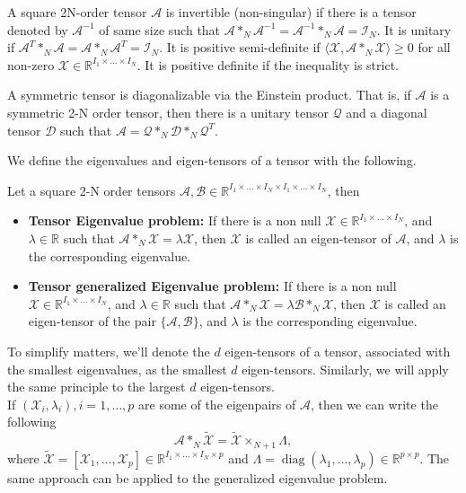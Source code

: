 \documentclass{siamltex}
\begin{document}
\medskip
\begin{definition}
A square 2N-order tensor $\mathcal{A}$ is invertible (non-singular) if there is a tensor denoted by $\mathcal{A}^{-1}$ of same size such that $\mathcal{A} *_N \mathcal{A}^{-1}=\mathcal{A}^{-1} *_N \mathcal{A} =\mathcal{I}_N$. It is unitary if $\mathcal{A}^T *_N \mathcal{A}=\mathcal{A} *_N \mathcal{A}^T =\mathcal{I}_N$.
It is positive semi-definite if $\langle \mathcal{X},\mathcal{A} *_N \mathcal{X}\rangle \geq 0$ for all non-zero $\mathcal{X} \in \mathbb{R}^{I_1 \times \ldots \times I_N}$.
It is positive definite if the inequality is strict.
\end{definition}

\medskip
\begin{theorem}\label{thm:Spectral}\cite{zahir2024higher}
A symmetric tensor is diagonalizable via the Einstein product. That is, if $\mathcal{A}$ is a symmetric 2-N order tensor, then there is a unitary tensor $\mathcal{Q}$ and a diagonal tensor $\mathcal{D}$ such that $\mathcal{A}=\mathcal{Q} *_N \mathcal{D} *_N \mathcal{Q}^T$.
\end{theorem}

\medskip
We define the eigenvalues and eigen-tensors of a tensor with the following.
\medskip
\begin{definition}\cite{wang2022generalized}
Let a square 2-N order tensors $\mathcal{A},\mathcal{B} \in \mathbb{R}^{I_1 \times \ldots \times I_N \times I_1 \times \ldots \times I_N}$, then
\begin{itemize}
\item \textbf{Tensor Eigenvalue problem:} If there is a non null $\mathcal{X} \in \mathbb{R}^{I_1 \times \ldots \times I_N}$, and $\lambda \in \mathbb{R}$ such that $\mathcal{A} *_{N} \mathcal{X}=\lambda \mathcal{X}$, then $\mathcal{X}$ is called an eigen-tensor of $\mathcal{A}$, and $\lambda$ is the corresponding eigenvalue.
\item \textbf{Tensor generalized Eigenvalue problem:} If there is a non null $\mathcal{X} \in \mathbb{R}^{I_1 \times \ldots \times I_N}$, and $\lambda \in \mathbb{R}$ such that $\mathcal{A} *_{N} \mathcal{X}=\lambda \mathcal{B} *_N \mathcal{X}$, then $\mathcal{X}$ is called an eigen-tensor of the pair $\{ \mathcal{A},\mathcal{B} \}$, and $\lambda$ is the corresponding eigenvalue.
\end{itemize}
\end{definition}
\medskip
\noindent
To simplify matters, we'll denote the $d$ eigen-tensors of a tensor, associated with the smallest eigenvalues, as the smallest $d$ eigen-tensors. Similarly, we will apply the same principle to the largest $d$ eigen-tensors.\\
If $(\mathcal{X}_i,\lambda_i), i=1,\ldots,p$ are some of the eigenpairs of $\mathcal{A}$, then we can write the following
$$\mathcal{A} *_N \widetilde{\mathcal{X}}= \widetilde{\mathcal{X}} \times_{N+1} \Lambda,$$
where $\widetilde{\mathcal{X}}=[\mathcal{X}_1, \ldots, \mathcal{X}_p] \in \mathbb{R}^{I_1 \times \ldots \times I_N \times p}$ and $\Lambda=\operatorname{diag}(\lambda_1, \ldots, \lambda_p) \in \mathbb{R}^{p \times p}$. The same approach can be applied to the generalized eigenvalue problem.\\
\end{document}
